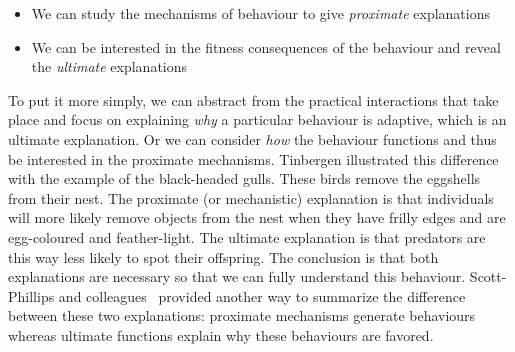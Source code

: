    \begin{itemize}
      \item {We can study the mechanisms of behaviour to give \emph{proximate} explanations}
      \item {We can be interested in the fitness consequences of the behaviour and reveal the \emph{ultimate} explanations}
    \end{itemize}

    To put it more simply, we can abstract from the practical interactions that take place and focus on explaining \emph{why} a particular behaviour is adaptive, which is an ultimate explanation. Or we can consider \emph{how} the behaviour functions and thus be interested in the proximate mechanisms. Tinbergen illustrated this difference with the example of the black-headed gulls. These birds remove the eggshells from their nest. The proximate (or mechanistic) explanation is that individuals will more likely remove objects from the nest when they have frilly edges and are egg-coloured and feather-light. The ultimate explanation is that predators are this way less likely to spot their offspring. The conclusion is that both explanations are necessary so that we can fully understand this behaviour. Scott-Phillips and colleagues~\parencite{Scott-Phillips2011} provided another way to summarize the difference between these two explanations: proximate mechanisms generate behaviours whereas ultimate functions explain why these behaviours are favored.

